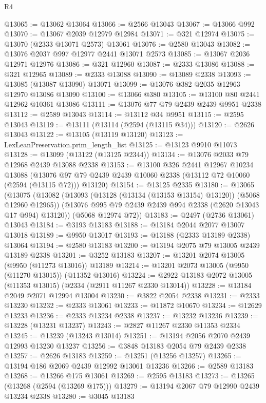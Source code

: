 \begin{lexlean}{R4}
\begin{coremodule}
@13065 := @13062 @13064
@13066 := @2566 @13043
@13067 := @13066 @992
@13070 := @13067 @2039 @12979 @12984
@13071 := @321 @12974
@13075 := @13070 (@2333 @13071 @2573) @13061
@13076 := @2580 @13043
@13082 := @13076 @2037 @997 @12977 @2441 @13071 @2573
@13085 := @13067 @2036 @12971 @12976
@13086 := @321 @12960
@13087 := @2333 @13086
@13088 := @321 @12965
@13089 := @2333 @13088
@13090 := @13089 @2338
@13093 := @13085 (@13087 @13090) @13071
@13099 := @13076 @382 @2035 @12963 @12970 @13086 @13090
@13100 := @13066 @380
@13105 := @13100 @80 @2441 @12962 @10361 @13086
@13111 := @13076 @77 @79 @2439 @2439 @9951 @2338
@13112 := @2589 @13043
@13114 := @13112 @34 @9951
@13115 := @2595 @13043
@13119 := @13111 (@13114 (@2594 (@13115 @34)))
@13120 := @2626 @13043
@13122 := @13105 (@13119 @13120)
@13123 := LexLeanPreservation.prim_length_list
@13125 := @13123 @9910 @11073
@13128 := @13099 (@13122 (@13125 @2344))
@13134 := @13076 @2033 @79 @12968 @2439 @13088 @2338
@13153 := @13100
    @326
    @2441
    @12967
    @10234
    @13088
    (@13076 @97 @79 @2439 @2439 @10060 @2338 (@13112 @72 @10060 (@2594 (@13115 @72))) @13120)
@13154 := @13125 @2335
@13180 := @13065
    (@13075
      (@13082
        (@13093 (@13128 (@13134 (@13153 @13154) @13120)) (@5068 @12960 @12965))
        (@13076 @995 @79 @2439 @2439 @994 @2338 (@2620 @13043 @17 @994) @13120))
      (@5068 @12974 @72))
@13183 := @2497 (@2736 @13061) @13043
@13184 := @3193 @13183
@13188 := @13184 @2044 @2077 @13007 @13018
@13189 := @9950 @13017
@13193 := @13188 (@2333 @13189 @2338) @13064
@13194 := @2580 @13183
@13200 := @13194 @2075 @79 @13005 @2439 @13189 @2338
@13201 := @3252 @13183
@13207 := @13201 @2074 @13005 (@9950 (@11273 @13016)) @13189
@13214 := @13201 @2073 @13005 (@9950 (@11270 @13015)) (@11352 @13016)
@13224 := @2922 @13183 @2072 @13005 (@11353 @13015) (@2334 (@2911 @11267 @2330 @13014))
@13228 := @13184 @2049 @2071 @12994 @13004
@13230 := @3822 @2054 @2338
@13231 := @2333 @13230
@13232 := @2333 @13061
@13233 := @11872 @10670
@13234 := @12629 @13233
@13236 := @2333 @13234 @2338
@13237 := @13232 @13236
@13239 := @13228 (@13231 @13237)
@13243 := @2827 @11267 @2330 @11353 @2334
@13245 := @13239 (@13243 @13014)
@13251 := @13194 @2056 @2070 @2439 @12993 @13230 @13237
@13256 := @3848 @13183 @2054 @79 @2439 @2338
@13257 := @2626 @13183
@13259 := @13251 (@13256 @13257)
@13265 := @13194 @186 @2069 @2439 @12992 @13061 @13236
@13266 := @2589 @13183
@13268 := @13266 @175 @13061
@13269 := @2595 @13183
@13273 := @13265 (@13268 (@2594 (@13269 @175)))
@13279 := @13194 @2067 @79 @12990 @2439 @13234 @2338
@13280 := @3045 @13183

\end{coremodule}
\end{lexlean}
